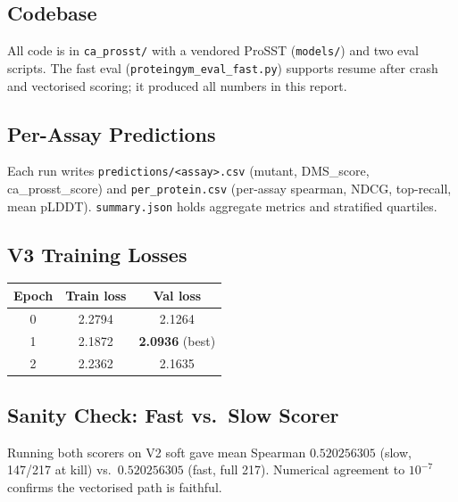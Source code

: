 \documentclass[11pt,a4paper]{article}
\begin{document}
\subsection{Codebase}
All code is in \texttt{ca\_prosst/} with a vendored ProSST (\texttt{models/})
and two eval scripts. The fast eval (\texttt{proteingym\_eval\_fast.py})
supports resume after crash and vectorised scoring; it produced all numbers
in this report.

\subsection{Per-Assay Predictions}
Each run writes \texttt{predictions/<assay>.csv} (mutant, DMS\_score,
ca\_prosst\_score) and \texttt{per\_protein.csv} (per-assay spearman, NDCG,
top-recall, mean pLDDT). \texttt{summary.json} holds aggregate metrics and
stratified quartiles.

\subsection{V3 Training Losses}

\begin{table}[h]
\centering
\begin{tabular}{ccc}
\toprule
Epoch & Train loss & Val loss \\
\midrule
0 & 2.2794 & 2.1264 \\
1 & 2.1872 & \textbf{2.0936} (best) \\
2 & 2.2362 & 2.1635 \\
\bottomrule
\end{tabular}
\end{table}

\subsection{Sanity Check: Fast vs.\ Slow Scorer}
Running both scorers on V2 soft gave mean Spearman $0.520256305$ (slow,
147/217 at kill) vs.\ $0.520256305$ (fast, full 217). Numerical agreement
to $10^{-7}$ confirms the vectorised path is faithful.
\end{document}
